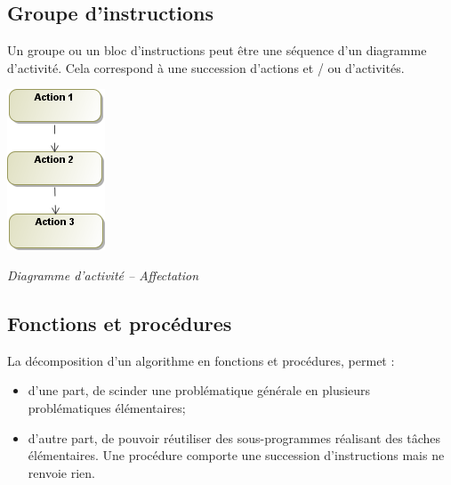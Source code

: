 \documentclass[10pt,fleqn]{article} %
\begin{document}
\subsection{Groupe d'instructions}
\begin{minipage}[c]{.68\linewidth}
Un groupe ou un bloc d’instructions peut être une séquence d’un diagramme
d’activité. Cela correspond à une succession d’actions et / ou d’activités.
\end{minipage} \hfill
\begin{minipage}[c]{.3\linewidth}
\begin{center}
\includegraphics[width=.5\textwidth]{images/Groupe_act}

\textit{Diagramme d'activité -- Affectation}
\end{center}
\end{minipage}


\subsection{Fonctions et procédures}
La décomposition d’un algorithme en fonctions et procédures, permet :
\begin{itemize}
\item d’une part, de scinder une problématique générale en plusieurs problématiques
élémentaires;
\item d’autre part, de pouvoir réutiliser des sous-programmes réalisant des tâches élémentaires.
Une procédure comporte une succession d’instructions mais ne renvoie rien.
\end{itemize}
\end{document}
